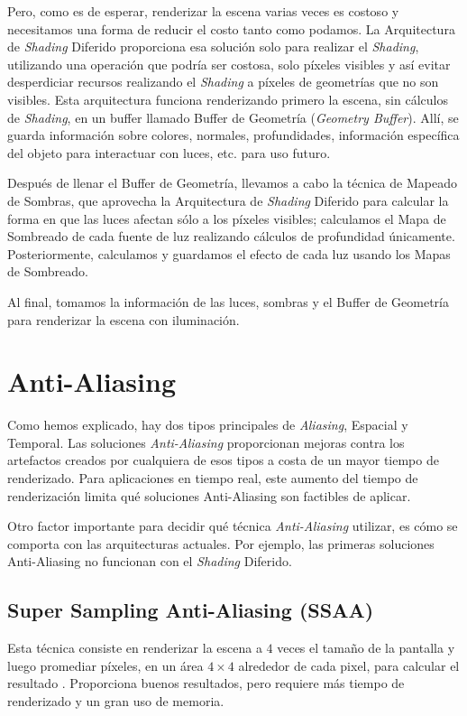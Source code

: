 \documentclass[pregrado]{tesis-usb} %
\begin{document}
Pero, como es de esperar, renderizar la escena varias veces es costoso y necesitamos una forma de reducir el costo tanto como podamos. La Arquitectura de \textit{Shading} Diferido proporciona esa solución solo para realizar el \textit{Shading}, utilizando una operación que podría ser costosa, solo píxeles visibles y así evitar desperdiciar recursos realizando el \textit{Shading} a píxeles de geometrías que no son visibles. Esta arquitectura funciona renderizando primero la escena, sin cálculos de \textit{Shading}, en un buffer llamado Buffer de Geometría (\textit{Geometry Buffer}). Allí, se guarda información sobre colores, normales, profundidades, información específica del objeto para interactuar con luces, etc. para uso futuro. 

Después de llenar el Buffer de Geometría, llevamos a cabo la técnica de Mapeado de Sombras, que aprovecha la Arquitectura de \textit{Shading} Diferido para calcular la forma en que las luces afectan sólo a los píxeles visibles; calculamos el Mapa de Sombreado de cada fuente de luz realizando cálculos de profundidad únicamente. Posteriormente, calculamos y guardamos el efecto de cada luz usando los Mapas de  Sombreado.

Al final, tomamos la información de las luces, sombras y el Buffer de Geometría para renderizar la escena con iluminación.


\section{Anti-Aliasing}
Como hemos explicado, hay dos tipos principales de \textit{Aliasing}, Espacial y Temporal. Las soluciones \textit{Anti-Aliasing} proporcionan mejoras contra los artefactos creados por cualquiera de esos tipos a costa de un mayor tiempo de renderizado. Para aplicaciones en tiempo real, este aumento del tiempo de renderización limita qué soluciones Anti-Aliasing son factibles de aplicar.

Otro factor importante para decidir qué técnica \textit{Anti-Aliasing} utilizar,  es cómo se comporta con las arquitecturas actuales. Por ejemplo, las primeras  soluciones Anti-Aliasing no funcionan con el \textit{Shading} Diferido.


\subsection{Super Sampling Anti-Aliasing (SSAA)}
Esta técnica consiste en renderizar la escena a $4$ veces el tamaño de la pantalla y luego promediar píxeles, en un área $4\times 4$ alrededor de cada pixel, para calcular el resultado \cite{Doggett2017EDAN35}. Proporciona buenos resultados, pero requiere más tiempo de renderizado y un gran uso de memoria.
\end{document}
